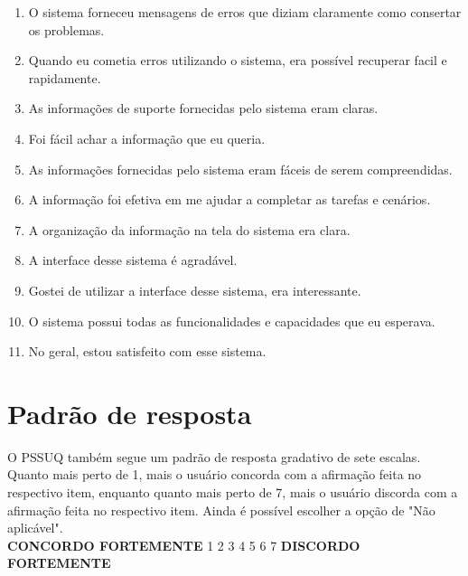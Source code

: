 \begin{anexosenv}
\begin{enumerate}
	  \item O sistema forneceu mensagens de erros que diziam claramente como consertar os problemas.

	  \item Quando eu cometia erros utilizando o sistema, era possível recuperar facil e rapidamente.

	  \item As informações de suporte fornecidas pelo sistema eram claras.

	  \item Foi fácil achar a informação que eu queria.

	  \item As informações fornecidas pelo sistema eram fáceis de serem compreendidas.

	  \item A informação foi efetiva em me ajudar a completar as tarefas e cenários.

	  \item A organização da informação na tela do sistema era clara.

	  \item A interface desse sistema é agradável.

	  \item Gostei de utilizar a interface desse sistema, era interessante.

	  \item O sistema possui todas as funcionalidades e capacidades que eu esperava.

	  \item No geral, estou satisfeito com esse sistema.
	\end{enumerate}
      
      \section*{Padrão de resposta}
      
	O PSSUQ também segue um padrão de resposta gradativo de sete escalas. Quanto mais perto de 1, mais o usuário concorda com a 
	afirmação feita no respectivo item, enquanto quanto mais perto de 7, mais o usuário discorda com a afirmação feita no
	respectivo item. Ainda é possível escolher a opção de "Não aplicável".\\
            
	\noindent
	\textbf{CONCORDO FORTEMENTE}   1    2    3    4    5    6    7    \textbf{DISCORDO FORTEMENTE}
    
    

\end{anexosenv}
